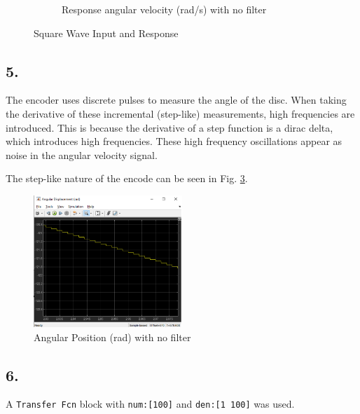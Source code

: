 \documentclass[letterpaper,12pt]{article}
\begin{document}
\begin{figure}[h]
\begin{subfigure}[t]{0.4\textwidth}
        \caption{Response angular velocity (rad/s) with no filter}
        \label{fig:my_label}
    \end{subfigure}
    \caption{Square Wave Input and Response}
\end{figure}

\subsection*{5.}
The encoder uses discrete pulses to measure the angle of the disc. When taking the derivative of these 
incremental (step-like) measurements, high frequencies are introduced. This is because the derivative 
of a step function is a dirac delta, which introduces high frequencies. These high frequency oscillations
appear as noise in the angular velocity signal.

The step-like nature of the encode can be seen in Fig. \ref{fig:angular_position_no_filter}. 
\begin{figure}[h]
    \centering
    \includegraphics[width=0.5\textwidth]{Figures/square_wave_angular_displacement.png}
    \caption{Angular Position (rad) with no filter}
    \label{fig:angular_position_no_filter}
\end{figure}

\subsection*{6.}
A \texttt{Transfer Fcn} block with \texttt{num:[100]} and \texttt{den:[1 100]} was used.
\end{document}
